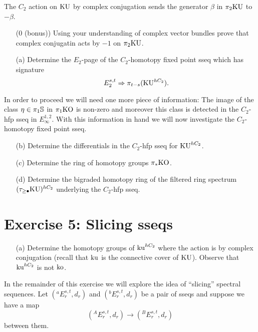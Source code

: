 \documentclass[reqno]{amsart}
\begin{document}
The $C_2$ action on $\mathrm{KU}$ by complex conjugation
sends the generator $\beta$ in $\pi_2\mathrm{KU}$ to $-\beta$.

\begin{itemize}
\item[(0 (bonus))] Using your understanding of complex vector bundles prove that
  complex conjugatin acts by $-1$ on $\pi_2\mathrm{KU}$.
\item[(a)] Determine the $E_2$-page of the $C_2$-homotopy fixed point sseq which has signature
  \[ E_2^{s,t} \Rightarrow \pi_{t-s}(\mathrm{KU}^{hC_2}). \]
\end{itemize}

In order to proceed we will need one more piece of information:
The image of the class $\eta \in \pi_1\mathbb{S}$ in $\pi_1\mathrm{KO}$ is non-zero and
moreover this class is detected in the $C_2$-hfp sseq in $E_\infty^{1,2}$.
With this information in hand we will now investigate the $C_2$-homotopy fixed point sseq.

\begin{itemize}
\item[(b)] Determine the differentials in the $C_2$-hfp sseq for $\mathrm{KU}^{hC_2}$.
\item[(c)] Determine the ring of homotopy groups $\pi_*\mathrm{KO}$.
\item[(d)] Determine the bigraded homotopy ring of the filtered ring spectrum
  $(\tau_{\geq \bullet} \mathrm{KU})^{hC_2}$ underlying the $C_2$-hfp sseq.
\end{itemize}

\section{\bf Exercise 5: Slicing sseqs}

\begin{itemize}
\item[(a)] Determine the homotopy groups of $\mathrm{ku}^{hC_2}$ where the action is by complex conjugation (recall that $\mathrm{ku}$ is the connective cover of $\mathrm{KU}$). Observe that $\mathrm{ku}^{hC_2}$ is not $\mathrm{ko}$.
\end{itemize}

In the remainder of this exercise we will explore the idea of ``slicing'' spectral sequences.
Let $\left( {}^aE_r^{s,t}, d_r \right)$ and $\left( {}^bE_r^{s,t}, d_r \right)$
be a pair of sseqs and suppose we have a  map
\[ \left( {}^AE_r^{s,t}, d_r \right) \to \left( {}^BE_r^{s,t}, d_r \right) \]
between them.
\end{document}
